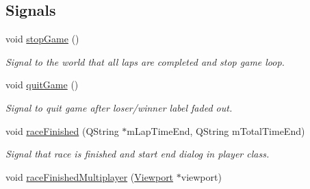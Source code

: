 \subsection*{Signals}
\begin{DoxyCompactItemize}
\item 
void \mbox{\hyperlink{class_viewport_a760083af13499cfcd0bf3edcdd1cb667}{stop\+Game}} ()
\begin{DoxyCompactList}\small\item\em Signal to the world that all laps are completed and stop game loop. \end{DoxyCompactList}\item 
void \mbox{\hyperlink{class_viewport_a6381ca87ee7069368f5c14e544814292}{quit\+Game}} ()
\begin{DoxyCompactList}\small\item\em Signal to quit game after loser/winner label faded out. \end{DoxyCompactList}\item 
void \mbox{\hyperlink{class_viewport_ade60c881ba4012c6a0fad5fbea967981}{race\+Finished}} (Q\+String $\ast$m\+Lap\+Time\+End, Q\+String m\+Total\+Time\+End)
\begin{DoxyCompactList}\small\item\em Signal that race is finished and start end dialog in player class. \end{DoxyCompactList}\item 
void \mbox{\hyperlink{class_viewport_a00e65ee2ec94764fb237b90462d540a5}{race\+Finished\+Multiplayer}} (\mbox{\hyperlink{class_viewport}{Viewport}} $\ast$viewport)
\end{DoxyCompactItemize}
